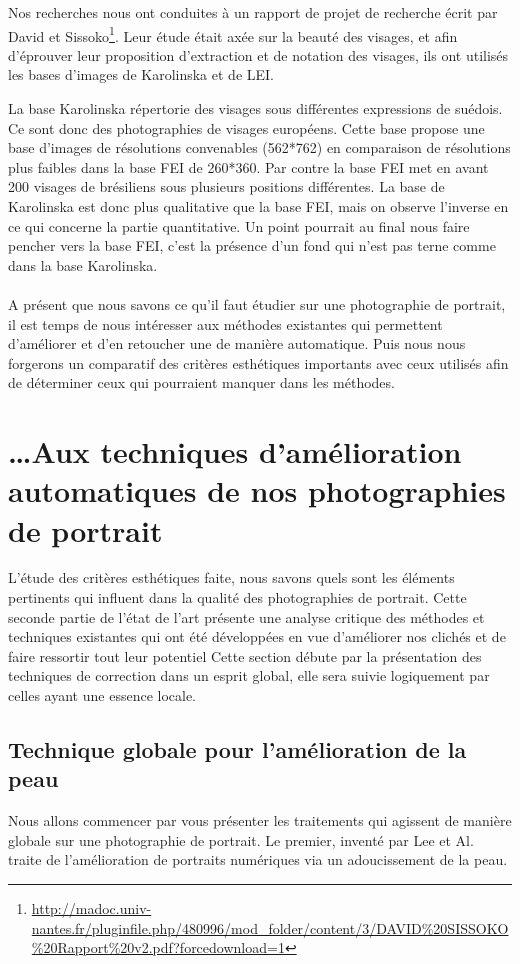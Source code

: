 \documentclass[11pt, french]{report-rd-info}
\begin{document}
Nos recherches nous ont conduites à un rapport de projet de recherche écrit par David et Sissoko\footnote{\url{http://madoc.univ-nantes.fr/pluginfile.php/480996/mod_folder/content/3/DAVID\%20SISSOKO\%20Rapport\%20v2.pdf?forcedownload=1}}. Leur étude était axée sur la beauté des visages, et afin d'éprouver leur proposition d'extraction et de notation des visages, ils ont utilisés les bases d'images de Karolinska et de LEI.

La base Karolinska répertorie des visages sous différentes expressions de suédois. Ce sont donc des photographies de visages européens. Cette base propose une base d'images de résolutions convenables (562*762) en comparaison de résolutions plus faibles dans la base FEI de 260*360. Par contre la base FEI met en avant 200 visages de brésiliens sous plusieurs positions différentes. La base de Karolinska est donc plus qualitative que la base FEI, mais on observe l'inverse en ce qui concerne la partie quantitative. Un point pourrait au final nous faire pencher vers la base FEI, c'est la présence d'un fond qui n'est pas terne comme dans la base Karolinska.
\paragraph*{}
A présent que nous savons ce qu'il faut étudier sur une photographie de portrait, il est temps de nous intéresser aux méthodes existantes qui permettent d'améliorer et d’en retoucher une de manière automatique. Puis nous nous forgerons un comparatif des critères esthétiques importants avec ceux utilisés afin de déterminer ceux qui pourraient manquer dans les méthodes.
\section{\ldots Aux techniques d’amélioration automatiques de nos photographies de portrait}
L’étude des critères esthétiques faite, nous savons quels sont les éléments pertinents qui influent dans la qualité des photographies de portrait. Cette seconde partie de l’état de l’art présente une analyse critique des méthodes et techniques existantes qui ont été développées en vue d’améliorer nos clichés et de faire ressortir tout leur potentiel
Cette section débute par la présentation des techniques de correction dans un esprit global, elle sera suivie logiquement par celles ayant une essence locale.
\subsection{Technique globale pour l’amélioration de la peau}
Nous allons commencer par vous présenter les traitements qui agissent de manière globale sur une photographie de portrait. Le premier, inventé par Lee et Al.\cite{Lee} traite de l'amélioration de portraits numériques via un adoucissement de la peau.
\end{document}
